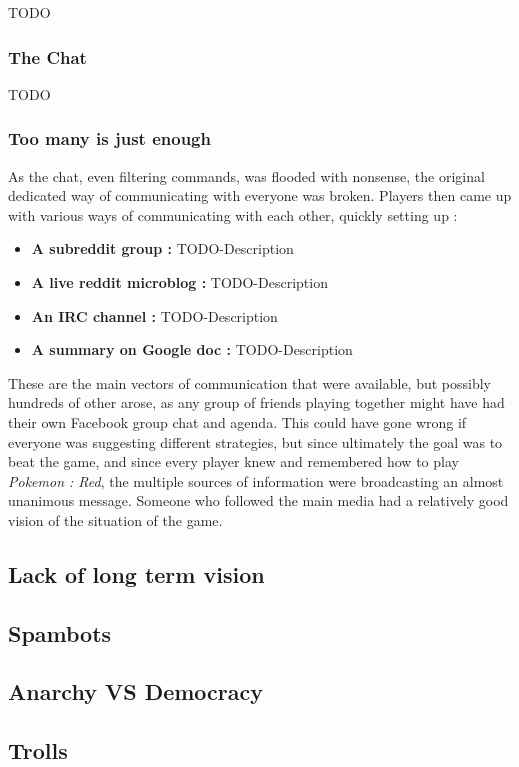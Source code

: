 \documentclass[a4paper]{article}
\begin{document}
TODO

\subsubsection{The Chat}

TODO

\subsubsection{Too many is just enough}
As the chat, even filtering commands, was flooded with nonsense, the original dedicated way of communicating with everyone was broken. Players then came up with various ways of communicating with each other, quickly setting up :
\begin{itemize}
\item \textbf{A subreddit group :} TODO-Description 
\item \textbf{A live reddit microblog :} TODO-Description 
\item \textbf{An IRC channel :}  TODO-Description 
\item \textbf{A summary on Google doc :}  TODO-Description 
\end{itemize}
These are the main vectors of communication that were available, but possibly hundreds of other arose, as any group of friends playing together might have had their own Facebook group chat and agenda. This could have gone wrong if everyone was suggesting different strategies, but since ultimately the goal was to beat the game, and since every player knew and remembered how to play \textit{Pokemon : Red}, the multiple sources of information were broadcasting an almost unanimous message. Someone who followed the main media had a relatively good vision of the situation of the game.

\subsection{Lack of long term vision}

\subsection{Spambots}

\subsection{Anarchy VS Democracy}

\subsection{Trolls}
\end{document}
